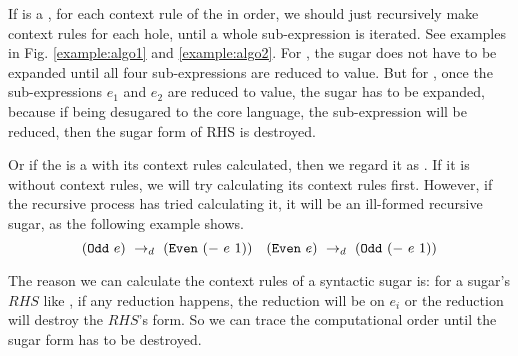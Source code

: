 If  is a , for each context rule of the  in order, we should just recursively make context rules for each hole, until a whole sub-expression is iterated. See examples in Fig.  \ref{example:algo1} and \ref{example:algo2}. For , the sugar does not have to be expanded until all four sub-expressions are reduced to value. But for , once the sub-expressions $e_1$ and $e_2$ are reduced to value, the sugar has to be expanded, because if being desugared to the core language, the sub-expression  will be reduced, then the sugar form of RHS is destroyed.


Or if the  is a  with its context rules calculated, then we regard it as . If it is without context rules, we will try calculating its context rules first. However, if the recursive process has tried calculating it, it will be an ill-formed recursive sugar, as the following example shows.
\[
(\mbox{\tt Odd}~e) ~\rightarrow_d~ (\mbox{\tt Even}~(-~e~1))\quad
(\mbox{\tt Even}~e) ~\rightarrow_d~ (\mbox{\tt Odd}~(-~e~1))
\]

The reason we can calculate the context rules of a syntactic sugar is: for a sugar's $RHS$ like , if any reduction happens, the reduction will be on $e_i$ or the reduction will destroy the $RHS$'s form. So we can trace the computational order until the sugar form has to be destroyed.

